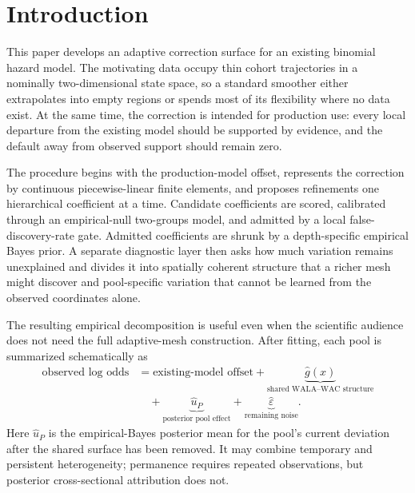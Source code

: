 \documentclass[11pt]{article}
\begin{document}
\tableofcontents

\section{Introduction}\label{sec:intro}

This paper develops an adaptive correction surface for an existing binomial hazard model. The
motivating data occupy thin cohort trajectories in a nominally two-dimensional state space, so a
standard smoother either extrapolates into empty regions or spends most of its flexibility where no
data exist. At the same time, the correction is intended for production use: every local departure
from the existing model should be supported by evidence, and the default away from observed support
should remain zero.

The procedure begins with the production-model offset, represents the correction by continuous
piecewise-linear finite elements, and proposes refinements one hierarchical coefficient at a time.
Candidate coefficients are scored, calibrated through an empirical-null two-groups model, and admitted
by a local false-discovery-rate gate. Admitted coefficients are shrunk by a depth-specific empirical
Bayes prior. A separate diagnostic layer then asks how much variation remains unexplained and divides
it into spatially coherent structure that a richer mesh might discover and pool-specific variation
that cannot be learned from the observed coordinates alone.

The resulting empirical decomposition is useful even when the scientific audience does not need the
full adaptive-mesh construction. After fitting, each pool is summarized schematically as
\begin{equation}\label{eq:three-way-decomposition}
\begin{aligned}
 \text{observed log odds}
 &= \text{existing-model offset}
 + \underbrace{\hat g(x)}_{\text{shared WALA--WAC structure}}\\
 &\quad + \underbrace{\hat u_P}_{\text{posterior pool effect}}
 + \underbrace{\hat\varepsilon}_{\text{remaining noise}}.
\end{aligned}
\end{equation}
Here $\hat u_P$ is the empirical-Bayes posterior mean for the pool's current deviation after the
shared surface has been removed. It may combine temporary and persistent heterogeneity; permanence
requires repeated observations, but posterior cross-sectional attribution does not.
\end{document}
